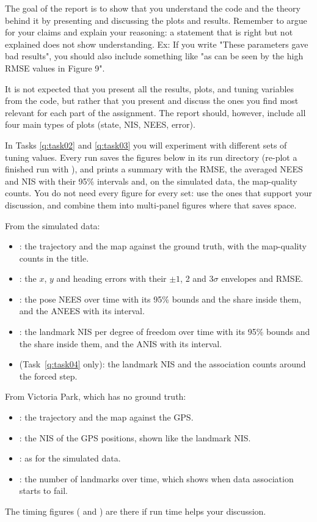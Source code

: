 \documentclass{exam}
\begin{document}
The goal of the report is to show that you understand the code and the theory behind it by presenting and discussing the plots and results. Remember to argue for your claims and explain your reasoning: a statement that is right but not explained does not show understanding.
Ex: If you write "These parameters gave bad results", you should also include something like "as can be seen by the high RMSE values in Figure 9".

It is not expected that you present all the results, plots, and tuning variables from the code, but rather that you present and discuss the ones you find most relevant for each part of the assignment. The report should, however, include all four main types of plots (state, NIS, NEES, error).

In Tasks \ref{q:task02} and \ref{q:task03} you will experiment with different sets of tuning values. Every run saves the figures below in its run directory (re-plot a finished run with ), and prints a summary with the RMSE, the averaged NEES and NIS with their 95\% intervals and, on the simulated data, the map-quality counts. You do not need every figure for every set: use the ones that support your discussion, and combine them into multi-panel figures where that saves space.

From the simulated data:
\begin{itemize}
	\item {}: the trajectory and the map against the ground truth, with the map-quality counts in the title.
	\item {}: the \(x\), \(y\) and heading errors with their \(\pm 1\), 2 and \(3\sigma\) envelopes and RMSE.
	\item {}: the pose NEES over time with its 95\% bounds and the share inside them, and the ANEES with its interval.
	\item {}: the landmark NIS per degree of freedom over time with its 95\% bounds and the share inside them, and the ANIS with its interval.
	\item {} (Task~\ref{q:task04} only): the landmark NIS and the association counts around the forced step.
\end{itemize}

From Victoria Park, which has no ground truth:
\begin{itemize}
	\item {}: the trajectory and the map against the GPS.
	\item {}: the NIS of the GPS positions, shown like the landmark NIS.
	\item {}: as for the simulated data.
	\item {}: the number of landmarks over time, which shows when data association starts to fail.
\end{itemize}
The timing figures ( and ) are there if run time helps your discussion.
\end{document}
